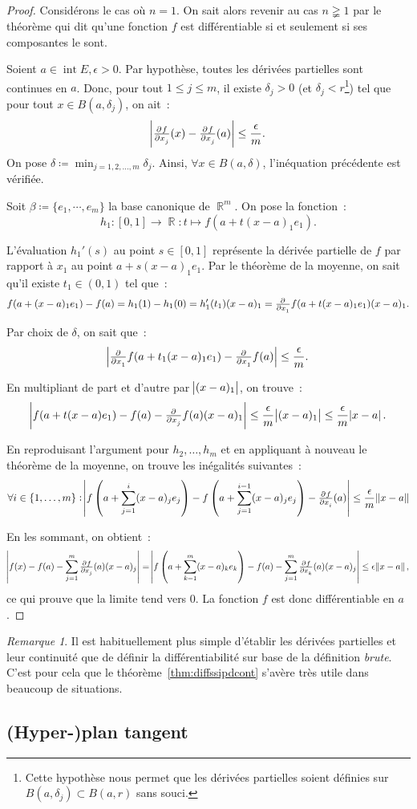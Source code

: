 \documentclass{article}
\DeclareMathOperator{\intr}{int}
\DeclareMathOperator{\R}{\mathbb R}
\theoremstyle{definition}
\theoremstyle{remark}
\newtheorem*{rmq}{Remarque}
\begin{document}
		\begin{proof} Considérons le cas où $n=1$. On sait alors revenir au cas $n \gneqq 1$ par le théorème qui dit qu'une fonction $f$ est différentiable si
		et seulement si ses composantes le sont.

		Soient $a \in \intr E, \epsilon > 0$. Par hypothèse, toutes les dérivées partielles sont continues en $a$. Donc, pour tout $1 \leq j \leq m$, il existe
		$\delta_j > 0$ (et $\delta_j < r$\footnote{Cette hypothèse nous permet que les dérivées partielles soient définies sur $B(a, \delta_j) \subset B(a, r)$
		sans souci.}) tel que pour tout $x \in B(a, \delta_j)$, on ait~:
		\[\abs{\pd f{x_j}(x) - \pd f{x_j}(a)} \leq \frac \epsilon m.\]
		On pose $\delta \coloneqq \min_{j = 1, 2, \dotsc, m}\delta_j$. Ainsi, $\forall x \in B(a, \delta)$, l'inéquation précédente est vérifiée.

		Soit $\beta \coloneqq \{e_1, \dotsb, e_m\}$ la base canonique de $\R^m$. On pose la fonction~:
		\[h_1 : [0, 1] \to \R : t \mapsto f(a + t(x-a)_1e_1).\]

		L'évaluation $h_1'(s)$ au point $s \in [0, 1]$ représente la dérivée partielle de $f$ par rapport à $x_1$ au point $a + s(x-a)_1e_1$. Par le théorème de
		la moyenne, on sait qu'il existe $t_1 \in (0, 1)$ tel que~:
		\[f(a + (x-a)_1e_1) - f(a) = h_1(1) - h_1(0) = h_1'(t_1)(x-a)_1 = \pd {}{x_1}f(a + t(x-a)_1e_1)(x-a)_1.\]

		Par choix de $\delta$, on sait que~:
		\[\abs{\pd {}{x_1}f(a + t_1(x-a)_1e_1) - \pd {}{x_1}f(a)} \leq \frac \epsilon m.\]

		En multipliant de part et d'autre par $\abs {(x-a)_1}$, on trouve~:
		\[\abs {f(a + t(x-a)e_1) - f(a) - \pd {}{x_j}f(a)(x-a)_1} \leq \frac \epsilon m\abs {(x-a)_1} \leq \frac \epsilon m \abs {x-a}.\]

		En reproduisant l'argument pour $h_2, \dotsc, h_m$ et en appliquant à nouveau le théorème de la moyenne, on trouve les inégalités suivantes~:
		\[\forall i \in \{1, \dotsc, m\} : \abs{f\left(a+ \sum_{j=1}^i(x-a)_je_j\right) - f\left(a + \sum_{j=1}^{i-1}(x-a)_je_j\right) - \pd f{x_i}(a)}
		\leq \frac \epsilon m \norm{x-a}\]

		En les sommant, on obtient~:
		\[\abs{f(x)-f(a) - \sum_{j=1}^m\pd f{x_j}(a)(x-a)_j} = \abs {f\left(a + \sum_{k=1}^m(x-a)_ke_k\right)-f(a) - \sum_{j=1}^m\pd f{x_k}(a)(x-a)_j}
		\leq \epsilon\norm{x-a},\]
		ce qui prouve que la limite tend vers 0. La fonction $f$ est donc différentiable en $a$.
		\end{proof}

		\begin{rmq} Il est habituellement plus simple d'établir les dérivées partielles et leur continuité que de définir la différentiabilité sur base de la
		définition \emph{brute}. C'est pour cela que le théorème~\ref{thm:diffssipdcont} s'avère très utile dans beaucoup de situations.
		\end{rmq}

	\subsection{(Hyper-)plan tangent}
\end{document}
